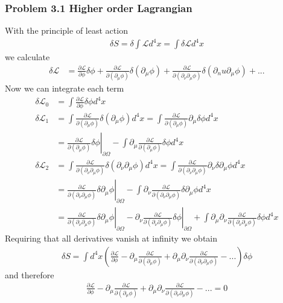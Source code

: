 \documentclass[10pt,a4paper]{article}
\theoremstyle{definition}
\begin{document}
\subsubsection{Problem 3.1 Higher order Lagrangian}
With the principle of least action
\begin{align}
\delta S=\delta\int\mathcal{L}d^4x=\int\delta\mathcal{L}d^4x
\end{align}
we calculate
\begin{align}
\delta\mathcal{L}
&=\frac{\partial \mathcal{L}}{\partial\phi}\delta\phi+
\frac{\partial \mathcal{L}}{\partial(\partial_\mu\phi)}\delta(\partial_\mu\phi)+
\frac{\partial \mathcal{L}}{\partial(\partial_\nu\partial_\mu\phi)}\delta(\partial_nu\partial_\mu\phi)+...
\end{align}
Now we can integrate each term
\begin{align}
\delta\mathcal{L}_0&=\int \frac{\partial \mathcal{L}}{\partial\phi}\delta\phi d^4x\\
%
\delta\mathcal{L}_1&=\int \frac{\partial \mathcal{L}}{\partial(\partial_\mu\phi)}\delta(\partial_\mu\phi) d^4x
=\int \frac{\partial \mathcal{L}}{\partial(\partial_\mu\phi)}\partial_\mu\delta\phi d^4x\\
&=\left.\frac{\partial \mathcal{L}}{\partial(\partial_\mu\phi)}\delta\phi\right|_{\partial\Omega}-\int \partial_\mu\frac{\partial \mathcal{L}}{\partial(\partial_\mu\phi)}\delta\phi d^4x\\
%
\delta\mathcal{L}_2&=\int \frac{\partial \mathcal{L}}{\partial(\partial_\nu\partial_\mu\phi)}\delta(\partial_\nu\partial_\mu\phi) d^4x
=\int \frac{\partial \mathcal{L}}{\partial(\partial_\nu\partial_\mu\phi)}\partial_\nu\delta\partial_\mu\phi d^4x\\
&=\left.\frac{\partial \mathcal{L}}{\partial(\partial_\nu\partial_\mu\phi)}\delta\partial_\mu\phi\right|_{\partial\Omega}-\int \partial_\nu\frac{\partial \mathcal{L}}{\partial(\partial_\nu\partial_\mu\phi)}\delta\partial_\mu\phi d^4x\\
&=\left.\frac{\partial \mathcal{L}}{\partial(\partial_\nu\partial_\mu\phi)}\delta\partial_\mu\phi\right|_{\partial\Omega}-\left.\partial_\nu\frac{\partial \mathcal{L}}{\partial(\partial_\nu\partial_\mu\phi)}\delta\phi\right|_{\partial\Omega}+\int \partial_\mu\partial_\nu\frac{\partial \mathcal{L}}{\partial(\partial_\nu\partial_\mu\phi)}\delta\phi d^4x
\end{align}
Requiring that all derivatives vanish at infinity we obtain
\begin{align}
\delta S=\int d^4x\left(
\frac{\partial \mathcal{L}}{\partial\phi}
- \partial_\mu\frac{\partial \mathcal{L}}{\partial(\partial_\mu\phi)}
+\partial_\mu\partial_\nu\frac{\partial \mathcal{L}}{\partial(\partial_\nu\partial_\mu\phi)}-...
\right)\delta\phi
\end{align}
and therefore
\begin{align}
\frac{\partial \mathcal{L}}{\partial\phi}
- \partial_\mu\frac{\partial \mathcal{L}}{\partial(\partial_\mu\phi)}
+\partial_\mu\partial_\nu\frac{\partial \mathcal{L}}{\partial(\partial_\nu\partial_\mu\phi)}-...=0
\end{align}
\end{document}
